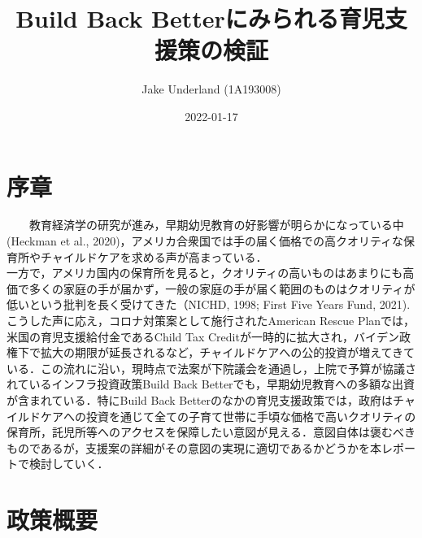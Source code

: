 \documentclass[
]{ltjarticle}
\title{Build Back Betterにみられる育児支援策の検証}
\author{Jake Underland (1A193008)}
\date{2022-01-17}
\begin{document}
\maketitle

\hypertarget{ux5e8fux7ae0}{%
\section{序章}\label{ux5e8fux7ae0}}

~~~~教育経済学の研究が進み，早期幼児教育の好影響が明らかになっている中(Heckman
et al.,
2020)，アメリカ合衆国では手の届く価格での高クオリティな保育所やチャイルドケアを求める声が高まっている．\\
\hspace*{0.333em}\hspace*{0.333em}\hspace*{0.333em}\hspace*{0.333em}一方で，アメリカ国内の保育所を見ると，クオリティの高いものはあまりにも高価で多くの家庭の手が届かず，一般の家庭の手が届く範囲のものはクオリティが低いという批判を長く受けてきた（NICHD,
1998; First Five Years Fund, 2021).\\
\hspace*{0.333em}\hspace*{0.333em}\hspace*{0.333em}\hspace*{0.333em}こうした声に応え，コロナ対策案として施行されたAmerican
Rescue Planでは，米国の育児支援給付金であるChild Tax
Creditが一時的に拡大され，バイデン政権下で拡大の期限が延長されるなど，チャイルドケアへの公的投資が増えてきている．この流れに沿い，現時点で法案が下院議会を通過し，上院で予算が協議されているインフラ投資政策Build
Back Betterでも，早期幼児教育への多額な出資が含まれている．特にBuild
Back
Betterのなかの育児支援政策では，政府はチャイルドケアへの投資を通じて全ての子育て世帯に手頃な価格で高いクオリティの保育所，託児所等へのアクセスを保障したい意図が見える．意図自体は褒むべきものであるが，支援案の詳細がその意図の実現に適切であるかどうかを本レポートで検討していく．

\hypertarget{ux653fux7b56ux6982ux8981}{%
\section{政策概要}\label{ux653fux7b56ux6982ux8981}}
\end{document}
